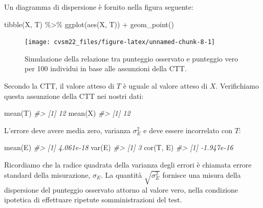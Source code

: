 \documentclass[
  11pt,
]{krantz}
\makeatletter
\newenvironment{Shaded}{\begin{snugshade}}{\end{snugshade}}
\newcommand{\CommentTok}[1]{\textcolor[rgb]{0.37,0.37,0.37}{\textit{#1}}}
\newcommand{\FunctionTok}[1]{\textcolor[rgb]{0,0,0}{#1}}
\newcommand{\NormalTok}[1]{#1}
\newcommand{\SpecialCharTok}[1]{\textcolor[rgb]{0,0,0}{#1}}
\newenvironment{kframe}{%
\medskip{}
\setlength{\fboxsep}{.8em}
 \def\at@end@of@kframe{}%
 \ifinner\ifhmode%
  \def\at@end@of@kframe{\end{minipage}}%
  \begin{minipage}{\columnwidth}%
 \fi\fi%
 \def\FrameCommand##1{\hskip\@totalleftmargin \hskip-\fboxsep
 \colorbox{shadecolor}{##1}\hskip-\fboxsep
     \hskip-\linewidth \hskip-\@totalleftmargin \hskip\columnwidth}%
 \MakeFramed {\advance\hsize-\width
   \@totalleftmargin\z@ \linewidth\hsize
   \@setminipage}}%
 {\par\unskip\endMakeFramed%
 \at@end@of@kframe}
\renewenvironment{Shaded}{\begin{kframe}}{\end{kframe}}
\theoremstyle{definition}
\theoremstyle{definition}
\theoremstyle{definition}
\theoremstyle{definition}
\theoremstyle{remark}
\makeatother
\begin{document}
Un diagramma di dispersione è fornito nella figura seguente:

\begin{Shaded}
\begin{Highlighting}[]
\FunctionTok{tibble}\NormalTok{(X, T) }\SpecialCharTok{\%\textgreater{}\%}
  \FunctionTok{ggplot}\NormalTok{(}\FunctionTok{aes}\NormalTok{(X, T)) }\SpecialCharTok{+}
  \FunctionTok{geom\_point}\NormalTok{()}
\end{Highlighting}
\end{Shaded}

\begin{figure}

{\centering \texttt{[image: cvsm22\_files/figure-latex/unnamed-chunk-8-1]} 

}

\caption{Simulazione della relazione tra punteggio osservato e punteggio vero per 100 individui in base alle assunzioni della CTT.}\label{fig:unnamed-chunk-8}
\end{figure}

Secondo la CTT, il valore atteso di \(T\) è uguale al valore atteso di \(X\). Verifichiamo questa assunzione della CTT nei nostri dati:

\begin{Shaded}
\begin{Highlighting}[]
\FunctionTok{mean}\NormalTok{(T)}
\CommentTok{\#\textgreater{} [1] 12}
\FunctionTok{mean}\NormalTok{(X)}
\CommentTok{\#\textgreater{} [1] 12}
\end{Highlighting}
\end{Shaded}

L'errore deve avere media zero, varianza \(\sigma_E^2\) e deve essere incorrelato con \(T\):

\begin{Shaded}
\begin{Highlighting}[]
\FunctionTok{mean}\NormalTok{(E)}
\CommentTok{\#\textgreater{} [1] 4.061e{-}18}
\FunctionTok{var}\NormalTok{(E)}
\CommentTok{\#\textgreater{} [1] 3}
\FunctionTok{cor}\NormalTok{(T, E)}
\CommentTok{\#\textgreater{} [1] {-}1.947e{-}16}
\end{Highlighting}
\end{Shaded}

Ricordiamo che la radice quadrata della varianza degli errori è chiamata errore standard della misurazione, \(\sigma_E\). La quantità \(\sqrt{\sigma_E^2}\) fornisce una misura della dispersione del punteggio osservato attorno al valore vero, nella condizione ipotetica di effettuare ripetute somministrazioni del test.
\end{document}
